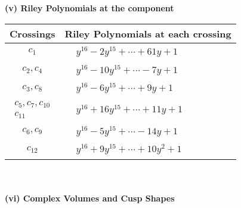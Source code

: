 \documentclass[1p]{elsarticle_modified}
\theoremstyle{definition}
\begin{document}
\newpage\renewcommand{\arraystretch}{1}
\flushleft \textbf{(v) Riley Polynomials at the component}\newline \\
\begin{tabular}{m{50pt}|m{274pt}}
Crossings & \hspace{64pt}Riley Polynomials at each crossing \\
\hline $$\begin{aligned}c_{1}\end{aligned}$$&$\begin{aligned}
&y^{16}-2 y^{15}+\cdots+61 y+1
\end{aligned}$\\
\hline $$\begin{aligned}c_{2},c_{4}\end{aligned}$$&$\begin{aligned}
&y^{16}-10 y^{15}+\cdots-7 y+1
\end{aligned}$\\
\hline $$\begin{aligned}c_{3},c_{8}\end{aligned}$$&$\begin{aligned}
&y^{16}-6 y^{15}+\cdots+9 y+1
\end{aligned}$\\
\hline $$\begin{aligned}c_{5},c_{7},c_{10}\\c_{11}\end{aligned}$$&$\begin{aligned}
&y^{16}+16 y^{15}+\cdots+11 y+1
\end{aligned}$\\
\hline $$\begin{aligned}c_{6},c_{9}\end{aligned}$$&$\begin{aligned}
&y^{16}-5 y^{15}+\cdots-14 y+1
\end{aligned}$\\
\hline $$\begin{aligned}c_{12}\end{aligned}$$&$\begin{aligned}
&y^{16}+9 y^{15}+\cdots+10 y^2+1
\end{aligned}$\\
\hline
\end{tabular}\\~\\
\newpage\flushleft \textbf{(vi) Complex Volumes and Cusp Shapes}
\end{document}
